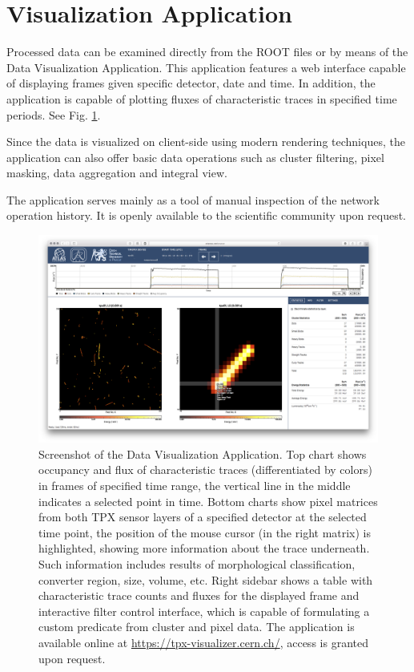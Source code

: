 

\section{\label{sec:dal}Visualization Application}
Processed data can be examined directly from the ROOT files or by means of the Data Visualization Application. \cite{Manek2016} This application features a web interface capable of displaying frames given specific detector, date and time. In addition, the application is capable of plotting fluxes of characteristic traces in specified time periods. See Fig. \ref{fig:visualizer}.

Since the data is visualized on client-side using modern rendering techniques, the application can also offer basic data operations such as cluster filtering, pixel masking, data aggregation and integral view.

The application serves mainly as a tool of manual inspection of the network operation history. It is openly available to the scientific community upon request.

\begin{figure}[tbp]
  \centering
  \includegraphics[clip, width=\textwidth, angle = 0 ]{Plots/screen-tpx01-crosshair-zoomed.png}
  \caption {Screenshot of the Data Visualization Application. \cite{Manek2016} Top chart shows occupancy and flux of characteristic traces (differentiated by colors) in frames of specified time range, the vertical line in the middle indicates a selected point in time. Bottom charts show pixel matrices from both TPX sensor layers of a specified detector at the selected time point, the position of the mouse cursor (in the right matrix) is highlighted, showing more information about the trace underneath. Such information includes results of morphological classification, converter region, size, volume, etc. Right sidebar shows a table with characteristic trace counts and fluxes for the displayed frame and interactive filter control interface, which is capable of formulating a custom predicate from cluster and pixel data. The application is available online at \url{https://tpx-visualizer.cern.ch/}, access is granted upon request.}
  \label{fig:visualizer}
\end{figure}
